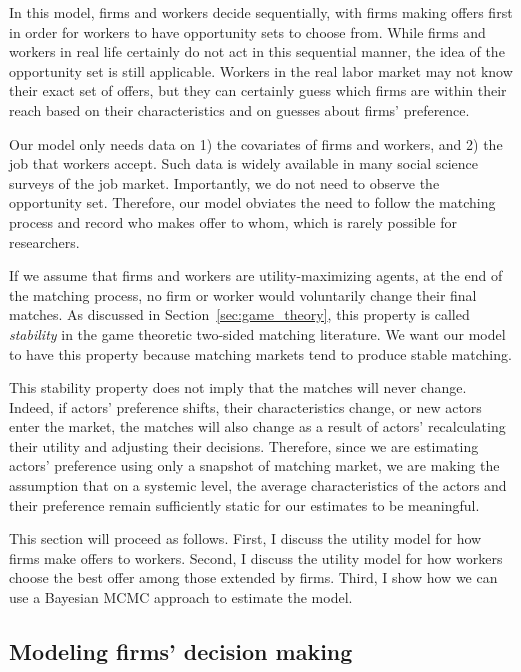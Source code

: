 In this model, firms and workers decide sequentially, with firms making offers
first in order for workers to have opportunity sets to choose from. While firms
and workers in real life certainly do not act in this sequential manner, the
idea of the opportunity set is still applicable. Workers in the real labor
market may not know their exact set of offers, but they can certainly guess
which firms are within their reach based on their characteristics and on guesses
about firms' preference.

Our model only needs data on 1) the covariates of firms and workers, and 2) the
job that workers accept. Such data is widely available in many social science
surveys of the job market. Importantly, we do not need to observe the
opportunity set. Therefore, our model obviates the need to follow the matching
process and record who makes offer to whom, which is rarely possible for
researchers.

If we assume that firms and workers are utility-maximizing agents, at the end of
the matching process, no firm or worker would voluntarily change their final
matches. As discussed in Section~\ref{sec:game_theory}, this property is called
\textit{stability} in the game theoretic two-sided matching literature. We want
our model to have this property because matching markets tend to produce stable
matching.

This stability property does not imply that the matches will never change.
Indeed, if actors' preference shifts, their characteristics change, or new
actors enter the market, the matches will also change as a result of actors'
recalculating their utility and adjusting their decisions. Therefore, since we
are estimating actors' preference using only a snapshot of matching market, we
are making the assumption that on a systemic level, the average characteristics
of the actors and their preference remain sufficiently static for our estimates
to be meaningful.

This section will proceed as follows. First, I discuss the utility model for how
firms make offers to workers. Second, I discuss the utility model for how
workers choose the best offer among those extended by firms. Third, I show how
we can use a Bayesian MCMC approach to estimate the model.

\subsection{Modeling firms' decision making}
\label{sec:model_firm_decision_making}

